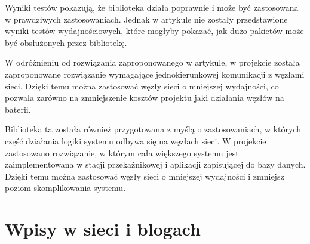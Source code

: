 Wyniki testów pokazują, że biblioteka działa poprawnie i może być zastosowana w prawdziwych zastosowaniach. Jednak w artykule nie zostały przedstawione wyniki testów wydajnościowych, które mogłyby pokazać, jak dużo pakietów może być obsłużonych przez bibliotekę.

W odróżnieniu od rozwiązania zaproponowanego w artykule, w projekcie została zaproponowane rozwiązanie wymagające jednokierunkowej komunikacji z węzłami sieci. Dzięki temu można zastosować węzły sieci o mniejszej wydajności, co pozwala zarówno na zmniejszenie kosztów projektu jaki działania węzłów na baterii.

Biblioteka ta została również przygotowana z myślą o zastosowaniach, w których część działania logiki systemu odbywa się na węzłach sieci. W projekcie zastosowano rozwiązanie, w którym cała większego systemu jest zaimplementowana w stacji przekaźnikowej i aplikacji zapisującej do bazy danych. Dzięki temu można zastosować węzły sieci o mniejszej wydajności i zmniejsz poziom skomplikowania systemu. 

\section{Wpisy w sieci i blogach}

